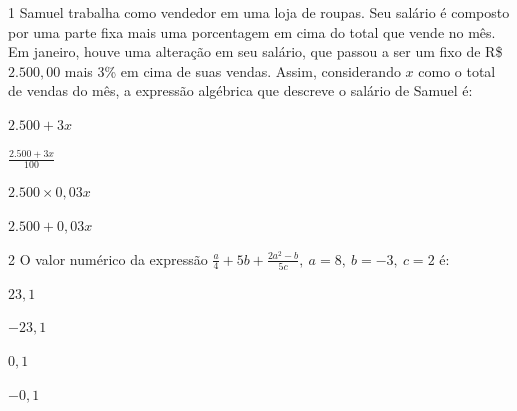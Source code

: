 \num{1} Samuel trabalha como vendedor em uma loja de roupas. Seu salário é
composto por uma parte fixa mais uma porcentagem em cima do total que
vende no mês. Em janeiro, houve uma alteração em seu salário, que passou
a ser um fixo de R\$ $2.500,00$ mais 3\% em cima de suas vendas. Assim,
considerando $x$ como o total de vendas do mês, a expressão algébrica
que descreve o salário de Samuel é:


\begin{multicols}{2}
\begin{escolha}[itemsep=0pt]
  \item $2.500 + 3x$
  \item $\frac{2.500 + 3x}{100}$
  \item $2.500 \times 0,03x$
  \item $2.500 + 0,03x$ 
\end{escolha}
\end{multicols}



\num{2} O valor numérico da expressão
$\frac{a}{4} + 5b + \frac{2a^{2} - b}{5c},\ a = 8,\ b = - 3,\ c = 2$
é:

\begin{multicols}{2}
\begin{escolha}[itemsep=0pt]
\item $23,1$
\item $- 23,1$
\item $0,1$ 
\item $- 0,1$
\end{escolha}
\end{multicols}

